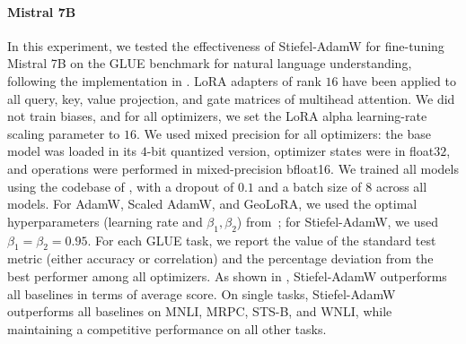 \documentclass[11pt,a4paper]{article}
\numberwithin{equation}{section}
\newcommand{\algname}{Stiefel-AdamW}
\theoremstyle{plain}
\theoremstyle{definition}
\theoremstyle{remark}
\begin{document}

\paragraph{Mistral 7B}

In this experiment, we tested the effectiveness of \algname{} for fine-tuning Mistral 7B \citep{jiang2023mistral7b} on the GLUE benchmark \citep{wang2019gluemultitaskbenchmarkanalysis} for natural language understanding, following the implementation in \citep{ZhangPilanci2024}. LoRA adapters of rank $16$ have been applied to all query, key, value projection, and gate matrices of multihead attention. We did not train biases, and for all optimizers, we set the LoRA alpha learning-rate scaling parameter to $16$. We used mixed precision for all optimizers: the base model was loaded in its $4$-bit quantized version, optimizer states were in float$32$, and operations were performed in mixed-precision bfloat16. We trained all models using the codebase of \cite{ZhangPilanci2024}, with a dropout of $0.1$ and a batch size of $8$ across all models. For AdamW, Scaled AdamW, and GeoLoRA, we used the optimal hyperparameters (learning rate and $\beta_1,\beta_2$) from~\cite{ZhangPilanci2024}; for \algname{}, we used $\beta_1 = \beta_2 = 0.95$. For each GLUE task, we report the value of the standard test metric (either accuracy or correlation) and the percentage deviation from the best performer among all optimizers.
As shown in , \algname{} outperforms all baselines in terms of average score. On single tasks, \algname{} outperforms all baselines on MNLI, MRPC, STS-B, and WNLI, while maintaining a competitive performance on all other tasks.
\end{document}

